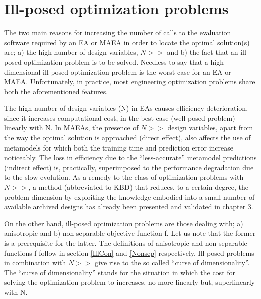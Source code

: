 



 

\section{Ill-posed optimization problems}
\label{illpost}
The two main reasons for increasing the number of calls to the evaluation software  required by an EA or MAEA in order to locate the optimal solution(s) are; a) the high number of design variables, $N\!>>$ and b) the fact that an ill-posed optimization problem is to be solved. Needless to say that a high-dimensional ill-posed optimization problem is the worst case for an EA or MAEA.  Unfortunately, in practice, most engineering optimization problems share both the aforementioned features. 

The high number of design variables (N) in EAs causes efficiency deterioration, since it increases computational cost, in the best case (well-posed problem) linearly with N. In MAEAs, the presence of $N\!>>$ design variables, apart from the way the optimal solution is approached (direct effect), also affects the use of metamodels for which both the training time and prediction error increase noticeably. The loss in efficiency due to the ``less-accurate'' metamodel predictions (indirect effect) is, practically, superimposed to the performance degradation due to the slow evolution.  As a remedy to the class of optimization problems with $N\!>>$, a method (abbreviated to KBD) that reduces,  to a certain degree, the problem dimension by exploiting the knowledge embodied into a small number of available archived designs has already been presented and validated in chapter 3.             

On the other hand, ill-posed optimization problems are those dealing with; a) anisotropic and b)  non-separable objective function f. Let us note that the former is a prerequisite for the latter. The definitions of anisotropic and non-separable functions f follow in section \ref{IllCon} and \ref{Nonsep} respectively. Ill-posed problems in combination with $N\!>>$ give rise to the so called ``curse of dimensionality''. The ``curse of dimensionality'' stands for the situation in which the cost for solving the optimization problem to increases, no more linearly but, superlinearly with N. 

